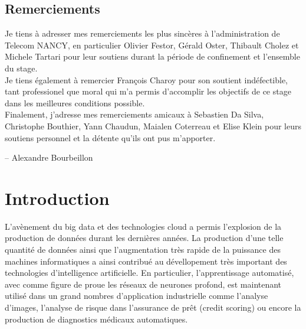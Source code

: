 \documentclass[stage3a]{tnreport} %
\begin{document}
\maketitle
{}


\cleardoublepage

\makesecondtitle

\section*{Remerciements}

{\em

Je tiens à adresser mes remerciements les plus sincères à l'administration de Telecom NANCY, en particulier Olivier Festor, Gérald Oster, Thibault Cholez et Michele Tartari pour leur soutiens durant la période de confinement et l'ensemble du stage. \\

Je tiens également à remercier François Charoy pour son soutient indéfectible, tant professionel que moral qui m'a permis d'accomplir les objectifs de ce stage dans les meilleures conditions possible.\\

Finalement, j'adresse mes remerciements amicaux à Sebastien Da Silva, Christophe Bouthier, Yann Chaudun, Maialen Coterreau et Elise Klein pour leurs soutiens personnel et la détente qu'ils ont pus m'apporter.

}

\hspace{4cm} -- Alexandre Bourbeillon


\cleardoublepage

\renewcommand{\baselinestretch}{0.5}\normalsize
\tableofcontents
\renewcommand{\baselinestretch}{1.0}\normalsize
\cleardoublepage

\setcounter{page}{1}

\chapter{Introduction}

L'avènement du big data et des technologies cloud a permis l'explosion de la production de données durant les dernières années. La production d'une telle quantité de données ainsi que l'augmentation très rapide de la puissance des machines informatiques a ainsi contribué au dévellopement très important des technologies d'intelligence artificielle. En particulier, l'apprentissage automatisé, avec comme figure de proue les réseaux de neurones profond, est maintenant utilisé dans un grand nombres d'application industrielle comme l'analyse d'images, l'analyse de risque dans l'assurance de prêt (credit scoring) ou encore la production de diagnostics médicaux automatiques.
\end{document}
